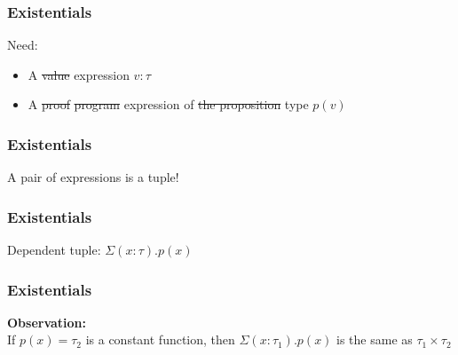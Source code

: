 \documentclass[usenames,dvipsnames]{beamer}
\begin{document}

\begin{frame}
  \frametitle{Existentials}

  Need:
  \begin{itemize}
    \item A \sout{value} expression $v:\tau$
    \item A \sout{proof} \sout{program} expression of \sout{the proposition} type
      $p(v)$
  \end{itemize}
\end{frame}


\begin{frame}
  \frametitle{Existentials}

  A pair of expressions is a tuple!
\end{frame}


\begin{frame}
  \frametitle{Existentials}

  Dependent tuple: $\Sigma (x:\tau) . p(x)$

  \begin{prooftree}
  \end{prooftree}

  \begin{prooftree}
  \end{prooftree}

  \begin{prooftree}
  \end{prooftree}
\end{frame}


\begin{frame}
  \frametitle{Existentials}

  \textbf{Observation:} \\
  If $p(x) = \tau_2$ is a constant function, then $\Sigma (x:\tau_1) . p(x)$
  is the same as $\tau_1 \times \tau_2$
\end{frame}
\end{document}
